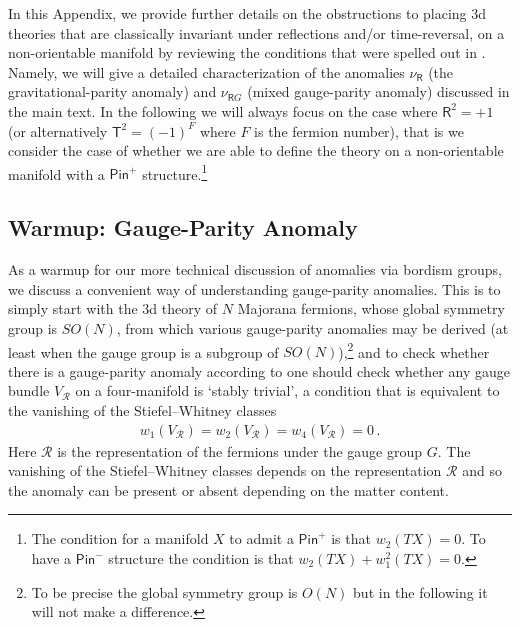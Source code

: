 \documentclass[12pt]{article}%
\numberwithin{equation}{section}
\newcommand{\al}[1]{\begin{align}#1\end{align}}
\renewcommand{\(}{\left(}
\renewcommand{\)}{\right)}
\renewcommand{\[}{\left[}
\renewcommand{\]}{\right]}
\begin{document}
In this Appendix, we provide further details on the obstructions to placing 3d theories that are classically invariant under reflections and/or time-reversal, on a non-orientable manifold by reviewing the conditions that were spelled out in \cite{Witten:2016cio}. Namely, we will give a detailed characterization of the anomalies $\nu_{\mathsf{R}}$ (the gravitational-parity anomaly) and $\nu_{\mathsf{R}G}$ (mixed gauge-parity anomaly) discussed in the main text. In the following we will always focus on the case where $\mathsf{R}^2=+1$ (or alternatively $\mathsf T^2 = (-1)^F$ where $F$ is the fermion number), that is we consider the case of whether we are able to define the theory on a non-orientable manifold with a $\mathsf{Pin}^+$ structure.\footnote{The condition for a manifold $X$ to admit a $\mathsf {Pin}^+$ is that $w_2(TX)= 0$. To have a $\mathsf{Pin}^-$ structure the condition is that $w_2(TX)+w_1^2(TX) =0$.}

\subsection{Warmup: Gauge-Parity Anomaly}

As a warmup for our more technical discussion of anomalies via bordism groups, we discuss a convenient way of understanding gauge-parity anomalies. This is to simply start with the 3d theory of $N$ Majorana fermions, whose global symmetry group is $SO(N)$, from which various gauge-parity anomalies may be derived (at least when the gauge group is a subgroup of $SO(N)$),\footnote{To be precise the global symmetry group is $O(N)$ but in the following it will not make a difference.} and to check whether there is a gauge-parity anomaly according to \cite{Witten:2016cio} one should check whether any gauge bundle $V_{\mathcal R}$ on a four-manifold is `stably trivial', a condition that is equivalent to the vanishing of the Stiefel--Whitney classes
%
\al{w_1(V_\mathcal R) = w_2(V_\mathcal R)= w_4(V_\mathcal R) = 0\,.
}
%
Here $\mathcal R$ is the representation of the fermions under the gauge group $G$. The vanishing of the Stiefel--Whitney classes depends on the representation $\mathcal R$ and so the anomaly can be present or absent depending on the matter content.
\end{document}
